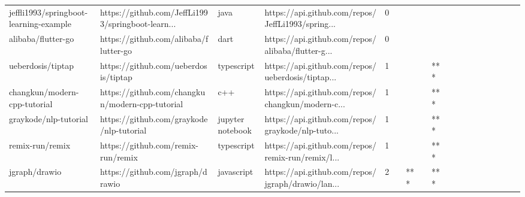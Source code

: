 \begin{tabular}{llllrlllllllllllll}
jeffli1993/springboot-learning-example             &  https://github.com/JeffLi1993/springboot-learn... &              java &  https://api.github.com/repos/JeffLi1993/spring... &       0 &         &        &           &                &                 &        &           &           &          &          &       &              &          \\
alibaba/flutter-go                                 &              https://github.com/alibaba/flutter-go &              dart &  https://api.github.com/repos/alibaba/flutter-g... &       0 &         &        &           &                &                 &        &           &           &          &          &       &              &          \\
ueberdosis/tiptap                                  &               https://github.com/ueberdosis/tiptap &        typescript &  https://api.github.com/repos/ueberdosis/tiptap... &       1 &         &        &           &            *** &                 &        &           &           &          &          &       &              &          \\
changkun/modern-cpp-tutorial                       &    https://github.com/changkun/modern-cpp-tutorial &               c++ &  https://api.github.com/repos/changkun/modern-c... &       1 &         &        &           &            *** &                 &        &           &           &          &          &       &              &          \\
graykode/nlp-tutorial                              &           https://github.com/graykode/nlp-tutorial &  jupyter notebook &  https://api.github.com/repos/graykode/nlp-tuto... &       1 &         &        &           &            *** &                 &        &           &           &          &          &       &              &          \\
remix-run/remix                                    &                 https://github.com/remix-run/remix &        typescript &  https://api.github.com/repos/remix-run/remix/l... &       1 &         &        &           &            *** &                 &        &           &           &          &          &       &              &          \\
jgraph/drawio                                      &                   https://github.com/jgraph/drawio &        javascript &  https://api.github.com/repos/jgraph/drawio/lan... &       2 &         &    *** &           &            *** &                 &        &           &           &          &          &       &              &          \\

\end{tabular}
